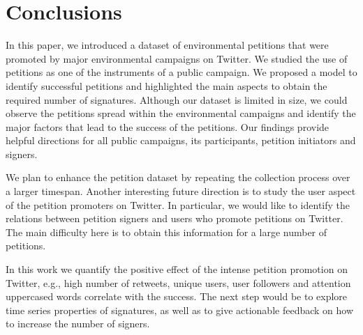 \section{Conclusions}
In this paper, we introduced a dataset of environmental petitions that were promoted by major environmental campaigns on Twitter.
We studied the use of petitions as one of the instruments of a public campaign.
We proposed a model to identify successful petitions and highlighted the main aspects to obtain the required number of signatures.
Although our dataset is limited in size, we could observe the petitions spread within the environmental campaigns and identify the major factors that lead to the success of the petitions.
Our findings provide helpful directions for all public campaigns, its participants, petition initiators and signers.

We plan to enhance the petition dataset by repeating the collection process over a larger timespan.
Another interesting future direction is to study the user aspect of the petition promoters on Twitter. In particular, we would like to identify the relations between petition signers and users who promote petitions on Twitter. The main difficulty here is to obtain this information for a large number of petitions.

In this work we quantify the positive effect of the intense petition promotion on Twitter, e.g., high number of retweets, unique users, user followers and attention uppercased words correlate with the success.
The next step would be to explore time series properties of signatures, as well as to give actionable feedback on how to increase the number of signers.